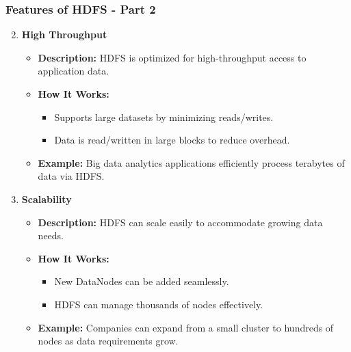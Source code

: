 \documentclass[aspectratio=169]{beamer}
\begin{document}
\begin{frame}[fragile]
    \frametitle{Features of HDFS - Part 2}
    \begin{enumerate}
        \setcounter{enumi}{1}
        \item \textbf{High Throughput}
        \begin{itemize}
            \item \textbf{Description:} HDFS is optimized for high-throughput access to application data.
            \item \textbf{How It Works:}
                \begin{itemize}
                    \item Supports large datasets by minimizing reads/writes.
                    \item Data is read/written in large blocks to reduce overhead.
                \end{itemize}
            \item \textbf{Example:} Big data analytics applications efficiently process terabytes of data via HDFS.
        \end{itemize}
        
        \item \textbf{Scalability}
        \begin{itemize}
            \item \textbf{Description:} HDFS can scale easily to accommodate growing data needs.
            \item \textbf{How It Works:}
                \begin{itemize}
                    \item New DataNodes can be added seamlessly.
                    \item HDFS can manage thousands of nodes effectively.
                \end{itemize}
            \item \textbf{Example:} Companies can expand from a small cluster to hundreds of nodes as data requirements grow.
        \end{itemize}
    \end{enumerate}
\end{frame}
\end{document}
